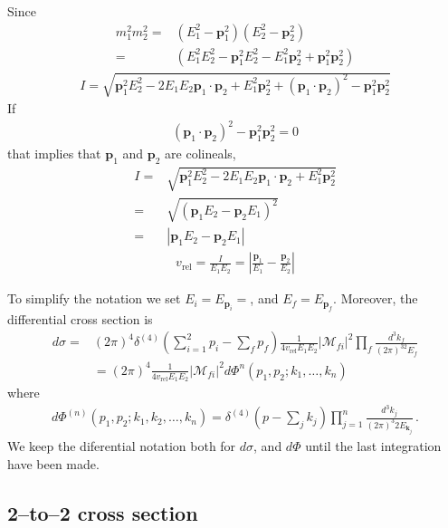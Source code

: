 \begin{borrar}
Since
\begin{align}
  m_1^2m_2^2=&(E_1^2-\mathbf{p}_1^2)(E_2^2-\mathbf{p}_2^2)\nonumber\\
=&(E_1^2E_2^2-\mathbf{p}_1^2E_2^2-E_1^2\mathbf{p}_2^2+\mathbf{p}_1^2\mathbf{p}_2^2)
\end{align}
\begin{align}
  I=\sqrt{\mathbf{p}_1^2E_2^2-2E_1 E_2\mathbf{p}_1\cdot\mathbf{p}_2+E_1^2\mathbf{p}_2^2
+(\mathbf{p}_1\cdot\mathbf{p}_2)^2-
\mathbf{p}_1^2\mathbf{p}_2^2}
\end{align}
If
\begin{align}
  (\mathbf{p}_1\cdot\mathbf{p}_2)^2-
\mathbf{p}_1^2\mathbf{p}_2^2=0
\end{align}
that implies that $\mathbf{p}_1$ and $\mathbf{p}_2$ are colineals,
\begin{align}
  I=&\sqrt{\mathbf{p}_1^2E_2^2-2E_1 E_2\mathbf{p}_1\cdot\mathbf{p}_2+E_1^2\mathbf{p}_2^2}
  \nonumber\\
  =&\sqrt{(\mathbf{p}_1E_2-\mathbf{p}_2E_1)^2}\nonumber\\
  =&|\mathbf{p}_1E_2-\mathbf{p}_2E_1|
\end{align}
\begin{align}
\label{eq:53}
v_{\text{rel}}=  \frac{I}{E_1E_2}=\left|
    \frac{\mathbf{p}_1}{E_1}-\frac{\mathbf{p}_2}{E_2}
  \right|
\end{align}
\end{borrar}
To simplify the notation we set $E_i=E_{\mathbf{p}_i}=$, and $E_f=E_{\mathbf{p}_f}$. Moreover, the differential cross section is
\begin{align}
    d\sigma=&(2\pi)^4\delta^{(4)}\left(\sum_{i=1}^2p_i-\sum_{f} p_f\right)
\frac{1}{4v_{\text{rel}}E_1E_2}\left|\mathcal{M}_{fi}\right|^2
\prod_{f}\frac{d^3k_f}{(2\pi)^32E_{f}}\nonumber\\
&=(2\pi)^4\frac{1}{4v_{\text{rel}}E_1E_2}\left|\mathcal{M}_{fi}\right|^2
d\Phi^{n}(p_1,p_2;k_1,\ldots,k_n)
\end{align}
where
\begin{align}
  \label{eq:50}
    d \Phi^{(n)} (p_1,p_2; k_1, k_2,\dots, k_n) = \delta^{(4)}\left(p-\sum_j k_j\right)  \prod_{j=1}^n \frac{d^3 k_j}{(2\pi)^3 2 E_{\mathbf{k}_j}} \,.
\end{align}
We keep the diferential notation both for $d\sigma$, and $d\Phi$ until the last integration have been made.

\subsection{2--to--2 cross section}
\label{sec:2-2-cross}

